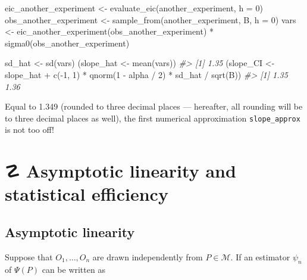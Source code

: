 \documentclass[
  11pt,
  openright,twoside]{book}
\newenvironment{Shaded}{\begin{snugshade}}{\end{snugshade}}
\newcommand{\AttributeTok}[1]{\textcolor[rgb]{0.77,0.63,0.00}{#1}}
\newcommand{\CommentTok}[1]{\textcolor[rgb]{0.56,0.35,0.01}{\textit{#1}}}
\newcommand{\DecValTok}[1]{\textcolor[rgb]{0.00,0.00,0.81}{#1}}
\newcommand{\FunctionTok}[1]{\textcolor[rgb]{0.00,0.00,0.00}{#1}}
\newcommand{\NormalTok}[1]{#1}
\newcommand{\OtherTok}[1]{\textcolor[rgb]{0.56,0.35,0.01}{#1}}
\newcommand{\SpecialCharTok}[1]{\textcolor[rgb]{0.00,0.00,0.00}{#1}}
\DeclareRobustCommand{\stixdanger}{%
  {\usefont{U}{stixbbit}{m}{it}\symbol{"F6}}%
}
\newcommand{\calM}{\mathcal{M}}
\theoremstyle{definition}
\theoremstyle{definition}
\theoremstyle{definition}
\theoremstyle{definition}
\theoremstyle{remark}
\begin{document}
\begin{Shaded}
\begin{Highlighting}[]
\NormalTok{eic\_another\_experiment }\OtherTok{\textless{}{-}} \FunctionTok{evaluate\_eic}\NormalTok{(another\_experiment, }\AttributeTok{h =} \DecValTok{0}\NormalTok{)}
\NormalTok{obs\_another\_experiment }\OtherTok{\textless{}{-}} \FunctionTok{sample\_from}\NormalTok{(another\_experiment, B, }\AttributeTok{h =} \DecValTok{0}\NormalTok{)}
\NormalTok{vars }\OtherTok{\textless{}{-}} \FunctionTok{eic\_another\_experiment}\NormalTok{(obs\_another\_experiment) }\SpecialCharTok{*}
  \FunctionTok{sigma0}\NormalTok{(obs\_another\_experiment)}

\NormalTok{sd\_hat }\OtherTok{\textless{}{-}} \FunctionTok{sd}\NormalTok{(vars)}
\NormalTok{(slope\_hat }\OtherTok{\textless{}{-}} \FunctionTok{mean}\NormalTok{(vars))}
\CommentTok{\#\textgreater{} [1] 1.35}
\NormalTok{(slope\_CI }\OtherTok{\textless{}{-}}\NormalTok{ slope\_hat }\SpecialCharTok{+} \FunctionTok{c}\NormalTok{(}\SpecialCharTok{{-}}\DecValTok{1}\NormalTok{, }\DecValTok{1}\NormalTok{) }\SpecialCharTok{*}
   \FunctionTok{qnorm}\NormalTok{(}\DecValTok{1} \SpecialCharTok{{-}}\NormalTok{ alpha }\SpecialCharTok{/} \DecValTok{2}\NormalTok{) }\SpecialCharTok{*}\NormalTok{ sd\_hat }\SpecialCharTok{/} \FunctionTok{sqrt}\NormalTok{(B))}
\CommentTok{\#\textgreater{} [1] 1.35 1.36}
\end{Highlighting}
\end{Shaded}

Equal to 1.349 (rounded to three decimal places ---
hereafter, all rounding will be to three decimal places as well), the first
numerical approximation \texttt{slope\_approx} is not too off!

\hypertarget{influence-curves}{%
\section{\texorpdfstring{☡ \stixdanger{} Asymptotic linearity and statistical efficiency}{☡  Asymptotic linearity and statistical efficiency}}\label{influence-curves}}

\hypertarget{asymptotic-linearity}{%
\subsection{Asymptotic linearity}\label{asymptotic-linearity}}

Suppose that \(O_{1}, \ldots, O_{n}\) are drawn independently from \(P\in \calM\). If an estimator \(\psi_n\) of \(\Psi(P)\) can be written as
\end{document}
